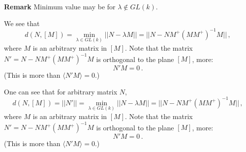 {\bf Remark} Minimum value may be for $\lambda\not\in GL(k)$.

   We see that
             $$
d(N,[M])=\min_{\lambda\in GL(k)}||N-\lambda M||=
   ||N-NM^+(MM^+)^{-1}M||\,,
             $$
             where $M$ is an arbitrary matrix in $[M]$.
Note that the matrix $N'=N-NM^+(MM^+)^{-1}M$ is orthogonal to the 
plane $[M]$, more:
                   $$
            N'M=0\,.
                   $$
   (This is more than $\langle N'M\rangle=0$.)




 One can see that  for arbitrary matrix $N$,
             $$
d(N,[M])=||N'||=\min_{\lambda\in GL(k)}||N-\lambda M||=
   ||N-NM^+(MM^+)^{-1}M||\,,
             $$
             where $M$ is an arbitrary matrix in $[M]$.
Note that the matrix $N'=N-NM^+(MM^+)^{-1}M$ is orthogonal to the 
plane $[M]$, more:
                   $$
            N'M=0\,.
                   $$
   (This is more than $\langle N'M\rangle=0$.)



